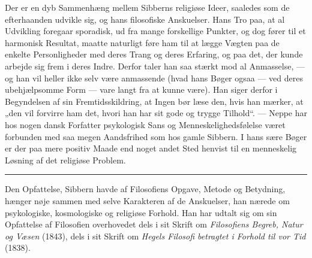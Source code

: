 \documentclass[12pt,a4paper,openany]{book}
\begin{document}
Der er en dyb Sammenhæng mellem Sibberns religiøse Ideer, saaledes som de
efterhaanden udvikle sig, og hans filosofiske Anskuelser. Hans Tro paa, at al
Udvikling foregaar sporadisk, ud fra mange forskellige Punkter, og dog fører
til et harmonisk Resultat, maatte naturligt føre ham til at lægge Vægten paa de
enkelte Personligheder med deres Trang og deres Erfaring, og paa det, der kunde
arbejde sig frem i deres Indre. Derfor taler han saa stærkt mod al Anmasselse,
--- og han vil heller ikke selv være anmassende (hvad hans Bøger ogsaa --- ved
deres ubehjælpsomme Form --- vare langt fra at kunne være). Han siger derfor i
Begyndelsen af sin Fremtidsskildring, at Ingen bør læse den, hvis han mærker,
at „den vil forvirre ham det, hvori han har sit gode og trygge Tilhold“. ---
Neppe har hos nogen dansk Forfatter psykologisk Sans og Menneskelighedsfølelse
været forbunden med saa megen Aandsfrihed som hos gamle Sibbern. I hans sære
Bøger er der paa mere positiv Maade end noget andet Sted henvist til en
menneskelig Løsning af det religiøse Problem.

\begin{center}\rule{2cm}{0.4pt}\end{center}

Den Opfattelse, Sibbern havde af Filosofiens Opgave, Metode og Betydning,
hænger nøje sammen med selve Karakteren af de Anskuelser, han nærede om
psykologiske, kosmologiske og religiøse Forhold. Han har udtalt sig om sin
Opfattelse af Filosofien overhovedet dels i sit Skrift om \textit{Filosofiens
Begreb, Natur og Væsen} (1843), dels i sit Skrift om \textit{Hegels Filosofi
betragtet i Forhold til vor Tid} (1838).
\end{document}

